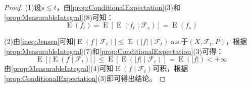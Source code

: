 \begin{proof}
	(1)设$s\leqslant t$，由\cref{prop:ConditionalExpectation}(3)和\cref{prop:MeasurableIntegral}(8)可知：
	\begin{equation*}
		\operatorname{E}(f_t)=\operatorname{E}[\operatorname{E}(f_t\mid\mathscr{F}_s)]=\operatorname{E}(f_s)
	\end{equation*}\par
	(2)由\cref{ineq:Jensen}可知$|\operatorname{E}(f\mid\mathscr{F}_t)|\leqslant\operatorname{E}(|f|\mid\mathscr{F}_t)\;$a.s.于$(X,\mathscr{F}_t,P)$，根据\cref{prop:MeasurableIntegral}(7)和\cref{prop:ConditionalExpectation}(3)可得：
	\begin{equation*}
		\operatorname{E}[|\operatorname{E}(f\mid\mathscr{F}_t)|]\leqslant\operatorname{E}[\operatorname{E}(|f|\mid\mathscr{F}_t)]=\operatorname{E}(|f|)<+\infty
	\end{equation*}
	由\cref{prop:MeasurableIntegral}(4)可知$\operatorname{E}(f\mid\mathscr{F}_t)$可积，根据\cref{prop:ConditionalExpectation}(3)即可得出结论。
\end{proof}

